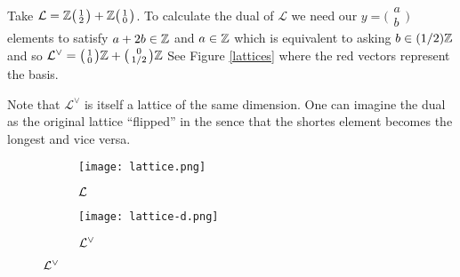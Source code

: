 \begin{example}\label{ld-ex}
    Take $\mathcal{L}= \mathbb{Z} 
        \big(\begin{smallmatrix} 1\\2 \end{smallmatrix}\big) + 
        \mathbb{Z} \big(\begin{smallmatrix} 1\\ 0 \end{smallmatrix}\big)$.
        To calculate the dual of $\mathcal{L}$ we need our $y = \big(\begin{smallmatrix}
          a\\b\end{smallmatrix}\big)$ elements to satisfy $a +2b \in \mathbb{Z}$ and $a \in \mathbb{Z}$ which is equivalent to asking $b \in (1/2)\mathbb{Z}$ and so $\mathcal{L}^{\vee} = \big(\begin{smallmatrix}
          1\\0
        \end{smallmatrix}\big)\mathbb{Z} + \big(\begin{smallmatrix}
          0\\1/2
        \end{smallmatrix}\big) \mathbb{Z}$
        See Figure \ref{lattices} where the red vectors represent the basis.
\end{example}

Note that $\mathcal{L}^{\vee}$ is itself a lattice of the same dimension. One can imagine the dual as the original lattice ``flipped'' in the sence that the shortes element becomes the longest and vice versa.
\begin{figure}[ht]
    \caption{Lattice $\Ll$ from Example \ref{ld-ex} and its dual.}
        \label{lattices}
        \centering
        \begin{subfigure}{.5\textwidth} 
                \centering
                \texttt{[image: lattice.png]}
                \caption{$\Ll$}
        \end{subfigure}%
        \begin{subfigure}{.5\textwidth}
                \centering
                \texttt{[image: lattice-d.png]}
                \caption{$\mathcal{L}^{\vee}$}
        \end{subfigure}
\end{figure}



